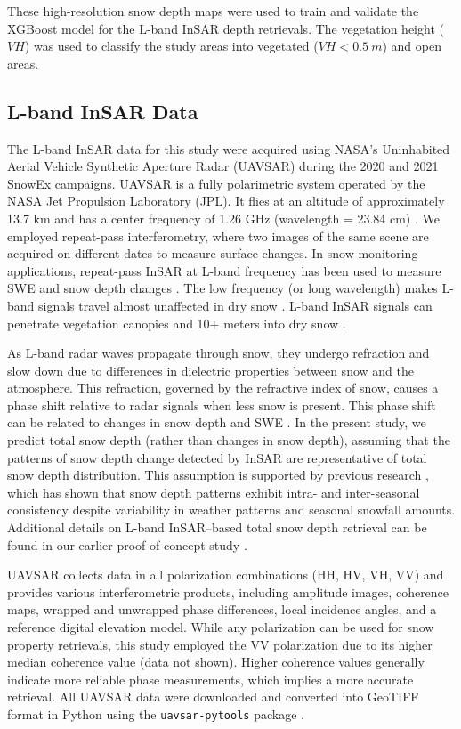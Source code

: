 \documentclass[lettersize,journal]{IEEEtran}
\begin{document}
These high-resolution snow depth maps were used to train and validate the XGBoost model for the L-band InSAR depth retrievals. The vegetation height ($VH$) was used to classify the study areas into vegetated ($VH < 0.5\ m$) and open areas.

\subsection{L-band InSAR Data}

The L-band InSAR data for this study were acquired using NASA's Uninhabited Aerial Vehicle Synthetic Aperture Radar (UAVSAR) during the 2020 and 2021 SnowEx campaigns. UAVSAR is a fully polarimetric system operated by the NASA Jet Propulsion Laboratory (JPL). It flies at an altitude of approximately 13.7 km and has a center frequency of 1.26 GHz (wavelength = 23.84 cm) \cite{hoppinen2023snow}. We employed repeat-pass interferometry, where two images of the same scene are acquired on different dates to measure surface changes. In snow monitoring applications, repeat-pass InSAR at L-band frequency has been used to measure SWE and snow depth changes \cite{guneriussen2001insar, deeb2011monitoring}. The low frequency (or long wavelength) makes L-band signals travel almost unaffected in dry snow \cite{hall2006estimation, marshall2005estimating}. L-band InSAR signals can penetrate vegetation canopies and 10+ meters into dry snow \cite{alabi5advancing}. 

As L-band radar waves propagate through snow, they undergo refraction and slow down due to differences in dielectric properties between snow and the atmosphere. This refraction, governed by the refractive index of snow, causes a phase shift relative to radar signals when less snow is present. This phase shift can be related to changes in snow depth and SWE \cite{guneriussen2001insar}. In the present study, we predict total snow depth (rather than changes in snow depth), assuming that the patterns of snow depth change detected by InSAR are representative of total snow depth distribution. This assumption is supported by previous research \cite{sturm2010using, mason2020snow, pflug2020inferring}, which has shown that snow depth patterns exhibit intra- and inter-seasonal consistency despite variability in weather patterns and seasonal snowfall amounts. Additional details on L-band InSAR–based total snow depth retrieval can be found in our earlier proof-of-concept study \cite{alabi5advancing}.

UAVSAR collects data in all polarization combinations (HH, HV, VH, VV) and provides various interferometric products, including amplitude images, coherence maps, wrapped and unwrapped phase differences, local incidence angles, and a reference digital elevation model. While any polarization can be used for snow property retrievals, this study employed the VV polarization due to its higher median coherence value (data not shown). Higher coherence values generally indicate more reliable phase measurements, which implies a more accurate retrieval. All UAVSAR data were downloaded and converted into GeoTIFF format in Python using the \texttt{uavsar-pytools} package \cite{uavsarpytools}.
\end{document}
